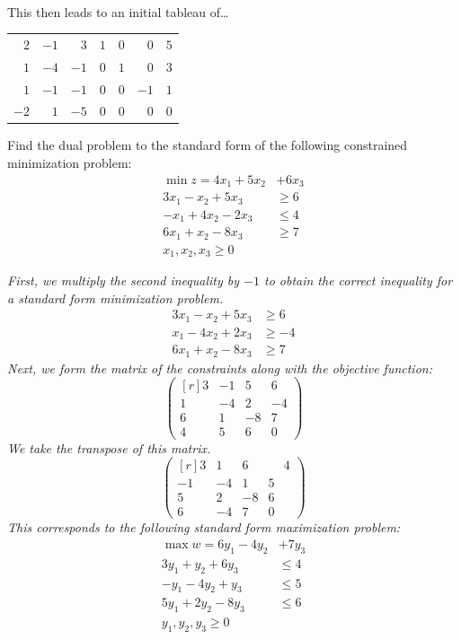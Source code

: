 \documentclass[12pt,letterpaper]{exam}
\begin{document}
\begin{questions}
{\[\begin{aligned}
	\end{aligned}
	\]
This then leads to an initial tableau of\dots \par
	\begin{table}[!ht]
	\centering
	\begin{tabular}{rrrrrr|r}
	$2$ & $-1$ & $3$ & $1$ & $0$ & $0$ & $5$ \\
	$1$ & $-4$ & $-1$ & $0$& $1$ & $0$ & $3$ \\
	$1$ & $-1$ & $-1$ & $0$ & $0$& $-1$ & $1$ \\ \hline
	$-2$ & $1$ & $-5$ & $0$ & $0$& $0$ & $0$
	\end{tabular}
	\end{table}
}





\newpage
\question[10] Find the dual problem to the standard form of the following constrained minimization problem: 
	\[
	\begin{aligned}
	\min z= 4x_1 + 5x_2& + 6x_3 \\
	3x_1 - x_2 + 5x_3&\geq 6 \\
	-x_1 + 4x_2 - 2x_3&\leq 4 \\
	6x_1 + x_2 - 8x_3&\geq 7 \\
	x_1, x_2, x_3 \geq 0
	\end{aligned}
	\] \pspace

{\itshape First, we multiply the second inequality by $-1$ to obtain the correct inequality for a standard form minimization problem. 
	\[
	\begin{aligned}
	3x_1 - x_2 + 5x_3&\geq 6 \\
	x_1 - 4x_2 + 2x_3&\geq -4 \\
	6x_1 + x_2 - 8x_3&\geq 7	
	\end{aligned}
	\]
Next, we form the matrix of the constraints along with the objective function:
	\[
	\begin{pmatrix*}[r]
	3 & -1 & 5 & 6 \\
	1 & -4 &  2 & -4 \\
	6 & 1 & -8 & 7 \\
	4 & 5 & 6 & 0 
	\end{pmatrix*}
	\]
We take the transpose of this matrix. 
	\[
	\begin{pmatrix*}[r]
	3 & 1 & 6 & \phantom{-}4 \\
	-1 & -4 & 1 & 5 \\
	5 & 2 & -8 & 6 \\
	6 & -4 & 7 & 0 
	\end{pmatrix*}
	\]
This corresponds to the following standard form maximization problem:
	\[
	\begin{aligned}
	\max w= 6y_1 - 4y_2& + 7y_3 \\
	3y_1 + y_2 + 6y_3&\leq 4 \\
	-y_1 - 4y_2 + y_3&\leq 5 \\
	5y_1 + 2y_2 - 8y_3&\leq 6 \\
	y_1, y_2, y_3 \geq 0
	\end{aligned}
	\] 
}






\end{questions}
\end{document}
